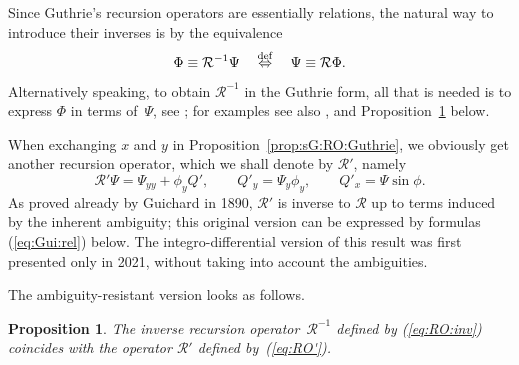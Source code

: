 \documentclass[pdftex]{sigma}
\def\eqref#1{{\rm(\ref{#1})}}
\def\RO{{\mathcal R}}
\numberwithin{equation}{section}
\newtheorem{Proposition}[Theorem]{Proposition}
\theoremstyle{definition}
\begin{document}
Since Guthrie's recursion operators are essentially relations,
the natural way to introduce their inverses is by the equivalence
\begin{equation}
\label{eq:RO:inv}
\Phi \equiv \RO^{-1}\Psi
\quad\stackrel{\rm def}{\Leftrightarrow}\quad
\Psi \equiv \RO\Phi.
\end{equation}
Alternatively speaking, to obtain $\RO^{-1}$ in the Guthrie form,
all that is needed is to express $\Phi$ in terms of~$\Psi$,
see \cite[Section~4]{GAG-1994}; for examples see also \cite[Section~6]{MM-alro},
\cite[Section~6.1]{MM-rzcr}
and Proposition~\ref{prop:sG:iRO:Guthrie} below.


When exchanging $x$ and $y$ in Proposition~\ref{prop:sG:RO:Guthrie},
we obviously get another recursion operator, which we shall denote by $\RO'$,
namely
\begin{equation}
\label{eq:RO'}
\RO'\Psi = \Psi_{yy} + \phi_y Q',
\qquad
Q'_y = \Psi_y \phi_y,
\qquad
Q'_{x} = \Psi \sin\phi.
\end{equation}
As proved already by Guichard in 1890,
$\RO'$ is inverse to $\RO$ up to terms induced by
the inherent ambiguity; this original version can be expressed by formulas
\eqref{eq:Gui:rel} below.
The integro-differential version \cite[Proposition~2]{L-H-L-2021} of this result
was first presented only in 2021,
without taking into account the ambiguities.

The ambiguity-resistant version looks as follows.

\begin{Proposition}
\label{prop:sG:iRO:Guthrie}
The inverse recursion operator~$\RO^{-1}$ defined by
\hbox{\eqref{eq:RO:inv}} coincides with the operator
$\RO'$ defined by~\eqref{eq:RO'}.
\end{Proposition}
\end{document}
